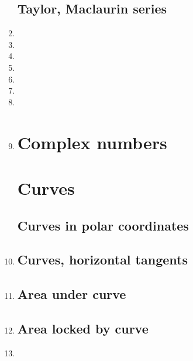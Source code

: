 \documentclass{article}
\begin{document}
\begin{enumerate}
\subsection{Taylor, Maclaurin series}
\item 
\item 
\item 
\item 
\item 
\item 
\item 
\item 
\section{Complex numbers}


\section{Curves}
\subsection{Curves in polar coordinates}
\item 

\subsection{Curves, horizontal tangents}
\item 


\subsection{Area under curve}
\item 
\subsection{Area locked by curve}
\item 



\end{enumerate}
\end{document}
